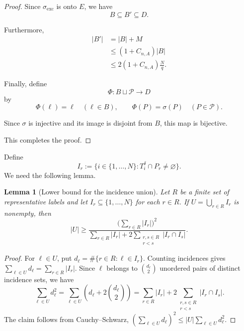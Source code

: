 \documentclass[11pt, letterpaper]{nyjm}
\newtheorem{lemma}[theorem]{Lemma}
\begin{document}
\begin{proof}
		Since $\sigma_{\mathrm{exc}}$ is onto $E$,
		we have
		\[
		B\subseteq B'\subseteq D.
		\]
		
		Furthermore,
		\[
		\begin{aligned}
			|B'|
			&=|B|+M\\
			&\le(1+C_{n,A})|B|\\
			&\le2(1+C_{n,A})\frac Nq.
		\end{aligned}
		\]
		
		Finally, define
		\[
		\Phi:B\sqcup\mathcal P\longrightarrow D
		\]
		by
		\[
		\Phi(\ell)=\ell\quad(\ell\in B),
		\qquad
		\Phi(P)=\sigma(P)\quad(P\in\mathcal P).
		\]
		
		Since $\sigma$ is injective and its
		image is disjoint from $B$, this
		map is bijective.
		
		This completes the proof.
	\end{proof}
	Define
	\[
	I_r:=\{i\in\{1,\ldots,N\}: T_i^\delta\cap P_r \ne\varnothing\}.
	\]
	We need the following lemma.
	 \begin{lemma}[Lower bound for the incidence union]
	 	\label{lem:incidence-union-lower-bound}
	 	Let $R$ be a finite set of representative labels and let
	 	$I_r\subseteq\{1,\ldots,N\}$ for each $r\in R$. If
	 	$U=\bigcup_{r\in R}I_r$ is nonempty, then
	 	\[
	 	|U|\ge
	 	\frac{\bigl(\sum_{r\in R}|I_r|\bigr)^2}
	 	{\displaystyle\sum_{r\in R}|I_r|
	 		+2\sum_{\substack{r,s\in R\\r<s}}|I_r\cap I_s|}.
	 	\]
	 \end{lemma}
	 
	 \begin{proof}
	 	For $\ell\in U$, put $d_\ell=\#\{r\in R:\ell\in I_r\}$.
	 	Counting incidences gives $\sum_{\ell\in U}d_\ell=\sum_{r\in R}|I_r|$.
	 	Since $\ell$ belongs to $\binom{d_\ell}{2}$ unordered pairs of
	 	distinct incidence sets, we have
	 	\[
	 	\sum_{\ell\in U}d_\ell^2
	 	=\sum_{\ell\in U}\left(d_\ell+2\binom{d_\ell}{2}\right)
	 	=\sum_{r\in R}|I_r|+2\sum_{\substack{r,s\in R\\r<s}}|I_r\cap I_s|.
	 	\]
	 	The claim follows from Cauchy--Schwarz,
	 	$(\sum_{\ell\in U}d_\ell)^2\le |U|\sum_{\ell\in U}d_\ell^2$.
	 \end{proof}
	 
\end{document}
